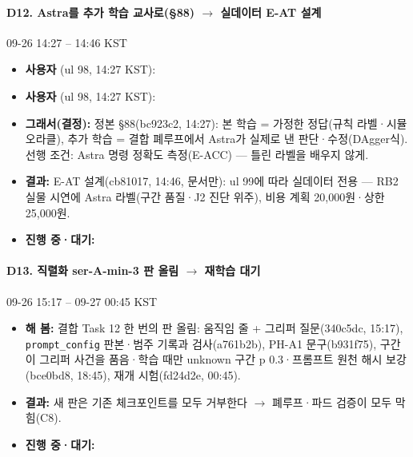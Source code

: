\paragraph{D12. Astra를 추가 학습 교사로(§88) $\rightarrow$ 실데이터 E-AT 설계}
{\small 09-26 14:27 -- 14:46 KST}
\begin{itemize}
  \item \textbf{사용자} (ul 98, 14:27 KST): 
  \item \textbf{사용자} (ul 98, 14:27 KST): 
  \item \textbf{그래서(결정):} 정본 §88(bc923c2, 14:27): 본 학습 = 가정한 정답(규칙 라벨·시뮬 오라클), 추가 학습 = 결합 폐루프에서 Astra가 실제로 낸 판단·수정(DAgger식). 선행 조건: Astra 명령 정확도 측정(E-ACC) --- 틀린 라벨을 배우지 않게.
  \item \textbf{결과:} E-AT 설계(cb81017, 14:46, 문서만): ul 99에 따라 실데이터 전용 --- RB2 실물 시연에 Astra 라벨(구간 품질·J2 진단 위주), 비용 계획 20,000원·상한 25,000원.
  \item \textbf{진행 중·대기:} 
\end{itemize}

\paragraph{D13. 직렬화 ser-A-min-3 판 올림 $\rightarrow$ 재학습 대기}
{\small 09-26 15:17 -- 09-27 00:45 KST}
\begin{itemize}
  \item \textbf{해 봄:} 결합 Task 12 한 번의 판 올림: 움직임 줄 + 그리퍼 질문(340c5dc, 15:17), \texttt{prompt\_\allowbreak{}config} 판본·범주 기록과 검사(a761b2b), PH-A1 문구(b931f75), 구간이 그리퍼 사건을 품음·학습 때만 unknown 구간 p 0.3·프롬프트 원천 해시 보강(bce0bd8, 18:45), 재개 시험(fd24d2e, 00:45).
  \item \textbf{결과:} 새 판은 기존 체크포인트를 모두 거부한다 $\rightarrow$ 폐루프·파드 검증이 모두 막힘(C8).
  \item \textbf{진행 중·대기:} 
\end{itemize}

